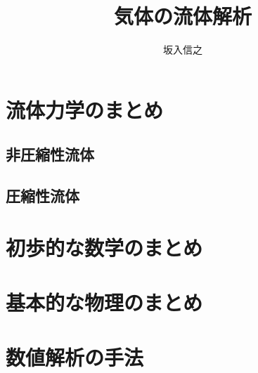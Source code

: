 \documentclass{ujbook}
\author{坂入信之}
\title{気体の流体解析}
\begin{document}
\maketitle
\frontmatter

\tableofcontents

\mainmatter
\part{流体力学のまとめ}
\chapter{非圧縮性流体}


\chapter{圧縮性流体}






\part{初歩的な数学のまとめ}





\part{基本的な物理のまとめ}


\part{数値解析の手法}





\appendix


\backmatter


\end{document}
